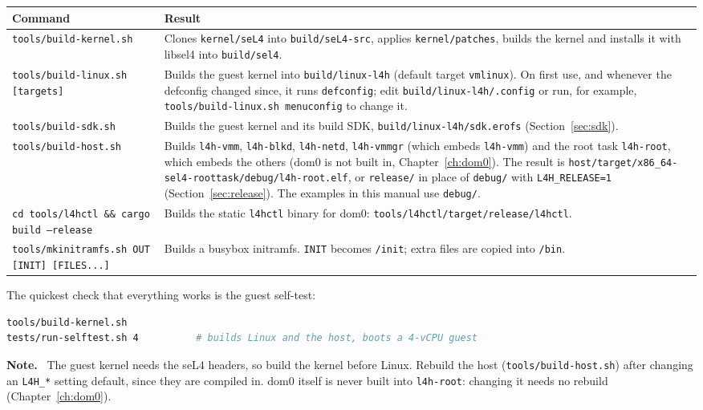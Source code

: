 \documentclass[11pt,a4paper]{report}
\newcommand{\cmd}[1]{\texttt{#1}}
\newcommand{\file}[1]{\texttt{#1}}
\newenvironment{caveat}{\par\medskip\noindent\color{note}\textbf{Note.}\ }{\par\medskip}
\begin{document}
\begin{longtable}{@{}p{5.2cm}p{9.3cm}@{}}
\toprule
Command & Result \\
\midrule
\endhead
\cmd{tools/build-kernel.sh} & Clones \file{kernel/seL4} into
  \file{build/seL4-src}, applies \file{kernel/patches}, builds the kernel and
  installs it with libsel4 into \file{build/sel4}. \\
\cmd{tools/build-linux.sh [targets]} & Builds the guest kernel into
  \file{build/linux-l4h} (default target \texttt{vmlinux}). On first use, and
  whenever the defconfig changed since, it runs \texttt{defconfig}; edit
  \file{build/linux-l4h/.config} or run, for example,
  \cmd{tools/build-linux.sh menuconfig} to change it. \\
\cmd{tools/build-sdk.sh} & Builds the guest kernel and its build SDK,
  \file{build/linux-l4h/sdk.erofs} (Section~\ref{sec:sdk}). \\
\cmd{tools/build-host.sh} & Builds \texttt{l4h-vmm}, \texttt{l4h-blkd},
  \texttt{l4h-netd}, \texttt{l4h-vmmgr} (which embeds \texttt{l4h-vmm}) and
  the root task \texttt{l4h-root}, which embeds the others
  (dom0 is not built in, Chapter~\ref{ch:dom0}). The result is
  \file{host/target/\allowbreak x86\_64-sel4-roottask/\allowbreak debug/\allowbreak l4h-root.elf},
  or \file{release/} in place of \file{debug/} with
  \texttt{L4H\_RELEASE=1} (Section~\ref{sec:release}). The examples in
  this manual use \file{debug/}. \\
\cmd{cd tools/l4hctl \&\& cargo build --release} & Builds the static
  \cmd{l4hctl} binary for dom0:
  \file{tools/l4hctl/target/release/l4hctl}. \\
\cmd{tools/mkinitramfs.sh OUT [INIT] [FILES...]} & Builds a busybox
  initramfs. \texttt{INIT} becomes \file{/init}; extra files are copied
  into \file{/bin}. \\
\bottomrule
\end{longtable}

The quickest check that everything works is the guest self-test:
\begin{lstlisting}[language=bash]
tools/build-kernel.sh
tests/run-selftest.sh 4          # builds Linux and the host, boots a 4-vCPU guest
\end{lstlisting}

\begin{caveat}
The guest kernel needs the seL4 headers, so build the kernel before Linux.
Rebuild the host (\cmd{tools/build-host.sh}) after changing an
\texttt{L4H\_*} setting default, since they are compiled in. dom0 itself is
never built into \texttt{l4h-root}: changing it needs no rebuild
(Chapter~\ref{ch:dom0}).
\end{caveat}
\end{document}
